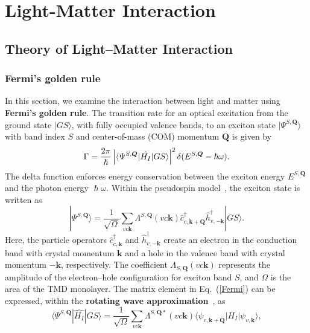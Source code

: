 \chapter{Light-Matter Interaction}
\label{ch:method}

\section{Theory of Light--Matter Interaction}
\subsection{Fermi's golden rule}

In this section, we examine the interaction between light and matter using \textbf{Fermi's golden rule}. The transition rate for an optical excitation from the ground state $|GS\rangle$, with fully occupied valence bands, to an exciton state $|\Psi^{S, \boldsymbol{Q}}\rangle$ with band index $S$ and center-of-mass (COM) momentum $\boldsymbol{Q}$ is given by
\begin{equation}
\color{G}
\Gamma=\frac{2\pi}{\hslash}
\left|
\langle\Psi^{S, \boldsymbol{Q}}|\hat{H_I}|GS\rangle
\right|^2
\delta(E^{S, \boldsymbol{Q}}-\hslash\omega).
\label{Fermi}
\end{equation}
The delta function enforces energy conservation between the exciton energy $E^{S, \boldsymbol{Q}}$ and the photon energy $\hslash\omega$. Within the pseudospin model~\cite{simbulan2021selective, peng2022tailoring, sanchez2024enhanced}, the exciton state is written as
\begin{equation}
|\Psi^{S, \boldsymbol{Q}}\rangle
=
\frac{1}{\sqrt{\Omega}} 
\sum_{vc\boldsymbol{k}} 
\Lambda^{S,\boldsymbol{Q}}(vc\boldsymbol{k})
\hat{c}^\dagger_{c,\boldsymbol{k}+\boldsymbol{Q}} 
\hat{h}^\dagger_{v,-\boldsymbol{k}} 
|GS\rangle.
\label{EXstate}
\end{equation}
Here, the particle operators $\hat{c}_{c,\boldsymbol{k}}^\dagger$ and $\hat{h}_{v,-\boldsymbol{k}}^\dagger$ create an electron in the conduction band with crystal momentum $\boldsymbol{k}$ and a hole in the valence band with crystal momentum $-\boldsymbol{k}$, respectively. The coefficient $\Lambda_{S,\boldsymbol{Q}}(vc\boldsymbol{k})$ represents the amplitude of the electron--hole configuration for exciton band $S$, and $\Omega$ is the area of the TMD monolayer.
The matrix element in Eq.~(\ref{Fermi}) can be expressed, within the \textbf{rotating wave approximation}~\cite{griffiths2018introduction}, as
\begin{equation}
\langle\Psi^{S, \boldsymbol{Q}}|\hat{H_I}|GS\rangle 
=
\frac{1}{\sqrt{\Omega}} 
\sum_{vc\boldsymbol{k}} 
\Lambda^{S,\boldsymbol{Q} *}(vc\boldsymbol{k}) 
\langle\psi_{c, \boldsymbol{k}+\boldsymbol{Q}}|H_I|\psi_{v, \boldsymbol{k}}\rangle,
\label{eq:matrix_element}
\end{equation}
